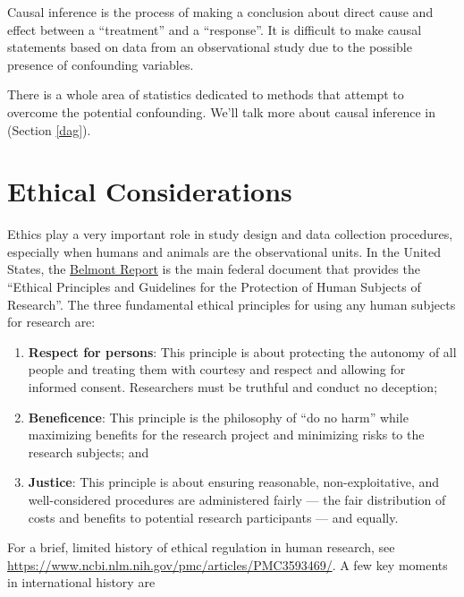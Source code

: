 \documentclass[
]{book}
\begin{document}
Causal inference is the process of making a conclusion about direct cause and effect between a ``treatment'' and a ``response''. It is difficult to make causal statements based on data from an observational study due to the possible presence of confounding variables.

There is a whole area of statistics dedicated to methods that attempt to overcome the potential confounding. We'll talk more about causal inference in (Section \ref{dag}).

\hypertarget{ethical-considerations}{%
\section{Ethical Considerations}\label{ethical-considerations}}

Ethics play a very important role in study design and data collection procedures, especially when humans and animals are the observational units. In the United States, the \href{https://www.hhs.gov/ohrp/regulations-and-policy/belmont-report/index.html}{Belmont Report} is the main federal document that provides the ``Ethical Principles and Guidelines for the Protection of Human Subjects of Research''. The three fundamental ethical principles for using any human subjects for research are:

\begin{enumerate}
\def\labelenumi{\arabic{enumi}.}
\item
  \textbf{Respect for persons}: This principle is about protecting the autonomy of all people and treating them with courtesy and respect and allowing for informed consent. Researchers must be truthful and conduct no deception;
\item
  \textbf{Beneficence}: This principle is the philosophy of ``do no harm'' while maximizing benefits for the research project and minimizing risks to the research subjects; and
\item
  \textbf{Justice}: This principle is about ensuring reasonable, non-exploitative, and well-considered procedures are administered fairly --- the fair distribution of costs and benefits to potential research participants --- and equally.
\end{enumerate}

For a brief, limited history of ethical regulation in human research, see \url{https://www.ncbi.nlm.nih.gov/pmc/articles/PMC3593469/}. A few key moments in international history are
\end{document}

